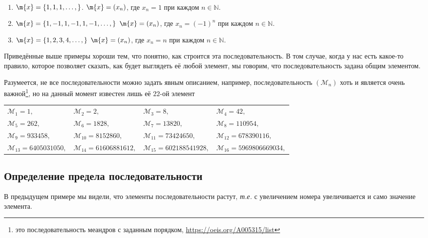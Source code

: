 \begin{example}~
    \begin{enumerate}
        \item $\m{x} = \{1,1,1,\ldots,\}$. \ie $\m{x} = (x_n)$, где $x_n = 1$ при каждом $n \in \mathbb{N}.$
        \item $\m{x} = \{1,-1,1,-1,1,-1,\ldots, \}$ \ie $\m{x} = (x_n)$, где $x_n = (-1)^n$ при каждом $n \in \mathbb{N}.$
        \item $\m{x} = \{1,2,3,4, \ldots,\}$ \ie $\m{x} = (x_n)$, где $x_n = n$ при каждом $n \in \mathbb{N}.$
    \end{enumerate}
\end{example}

Приведённые выше примеры хороши тем, что понятно, как строится эта последовательность. В том случае, когда у нас есть какое-то правило, которое позволяет сказать, как будет выглядеть её любой элемент, мы говорим, что последовательность задана общим элементом. 

Разумеется, не все последовательности можно задать явным описанием, например, последовательность $(\mathscr{M}_n)$ хоть и является очень важной\footnote{это последовательность меандров с заданным порядком, \url{https://oeis.org/A005315/list}}, но на данный момент известен лишь её $22$-ой элемент 
\begin{center}
 \begin{tabular}{llll}
    $\mathscr{M}_1=  1,$ & $\mathscr{M}_2 = 2,$ &  $\mathscr{M}_3 = 8,$ & $\mathscr{M}_4 = 42,$  \\
     $\mathscr{M}_5=  262,$ & $\mathscr{M}_6 = 1828,$ & $\mathscr{M}_7 = 13820,$ & $\mathscr{M}_8 = 110954,$ \\
     $\mathscr{M}_9=  933458,$ & $\mathscr{M}_{10} = 8152860,$ & $\mathscr{M}_{11} = 73424650,$ & $\mathscr{M}_{12} = 678390116,$ \\
    $\mathscr{M}_{13}=  6405031050,$ & $\mathscr{M}_{14} = 61606881612,$ & $\mathscr{M}_{15} = 602188541928,$ & $\mathscr{M}_{16} = 5969806669034,$ 
\end{tabular}    
\end{center}

\subsection{Определение предела последовательности}

В предыдущем примере мы видели, что элементы последовательности растут, \textit{т.е.} с увеличением номера увеличивается и само значение элемента.



